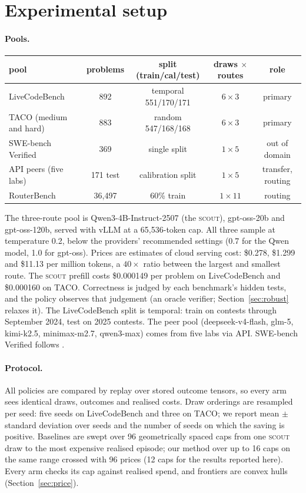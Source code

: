 \documentclass[10pt]{article} %
\newcommand{\scout}{\textsc{scout}\xspace}
\begin{document}
\section{Experimental setup}
\label{sec:setup}

\paragraph{Pools.}
\begin{center}
\small
\begin{tabular}{lcccc}
\toprule
pool & problems & split (train/cal/test) & draws $\times$ routes & role \\
\midrule
LiveCodeBench & 892 & temporal 551/170/171 & $6\times3$ & primary \\
TACO (medium and hard) & 883 & random 547/168/168 & $6\times3$ & primary \\
SWE-bench Verified & 369 & single split & $1\times5$ & out of domain \\
API peers (five labs) & 171 test & calibration split & $1\times5$ & transfer, routing \\
RouterBench \citep{hu2024routerbench} & 36{,}497 & 60\% train & $1\times11$ & routing \\
\bottomrule
\end{tabular}
\end{center}
The three-route pool is Qwen3-4B-Instruct-2507 (the \scout), gpt-oss-20b and gpt-oss-120b, served
with vLLM at a 65{,}536-token cap.  All three sample at temperature 0.2, below the providers'
recommended settings (0.7 for the Qwen model, 1.0 for gpt-oss).  Prices are estimates of
cloud serving cost: \$0.278, \$1.299 and \$11.13 per million tokens, a $40\times$ ratio between
the largest and smallest route.  The \scout prefill costs \$0.000149 per problem on
LiveCodeBench and \$0.000160 on TACO.  Correctness is judged by each benchmark's hidden tests,
and the policy observes that judgement (an oracle verifier; Section~\ref{sec:robust} relaxes
it).  The LiveCodeBench split is temporal: train on contests through September 2024, test on
2025 contests.  The peer pool (deepseek-v4-flash, glm-5, kimi-k2.5, minimax-m2.7, qwen3-max)
comes from five labs via API.  SWE-bench Verified follows \citet{jimenez2024swebench}.

\paragraph{Protocol.}
All policies are compared by replay over stored outcome tensors, so every arm sees identical
draws, outcomes and realised costs.  Draw orderings are resampled per seed: five seeds on
LiveCodeBench and three on TACO; we report mean $\pm$ standard deviation over seeds and the number
of seeds on which the saving is positive.  Baselines are swept over 96 geometrically spaced caps
from one \scout draw to the most expensive realised episode; our method over up to 16 caps on the same
range crossed with 96 prices (12 caps for the results reported here).  Every arm checks its cap against realised spend, and frontiers are
convex hulls (Section~\ref{sec:price}).
\end{document}
